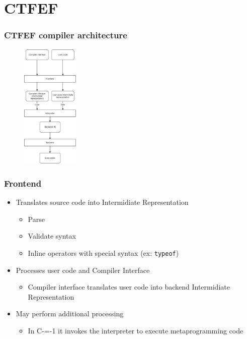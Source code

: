 \section{CTFEF}

\begin{frame}
    \frametitle{CTFEF compiler architecture}
    \begin{figure}
        
        \begin{center}
            \includegraphics[height=6cm]{pictures/compiler-structure.png}
        \end{center}
    \end{figure}

\end{frame}


\begin{frame}
    \frametitle{Frontend}

    \begin{itemize}
        \item Translates source code into Intermidiate Representation\begin{itemize}
            \item Parse
            \item Validate syntax
            \item Inline operators with special syntax (ex: \lstinline|typeof|)
        \end{itemize}
        \item Processes user code and Compiler Interface\begin{itemize}
            \item Compiler interface translates user code into backend Intermidiate Representation
        \end{itemize}
        \item May perform additional processing\begin{itemize}
            \item In C-=-1 it invokes the interpreter to execute metaprogramming code
        \end{itemize}
    \end{itemize}

\end{frame}

